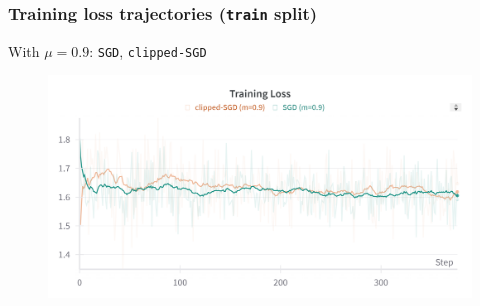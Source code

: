 \begin{frame}
    \frametitle{Training loss trajectories (\texttt{train} split)}
    With \(\mu=0.9\): \texttt{SGD}, \texttt{clipped-SGD}
    \begin{figure}[htpb]
        \begin{center}
            \includegraphics[width=\linewidth]
                {pics/experiments/train_loss_sgdm}
        \end{center}
    \end{figure}
\end{frame}
